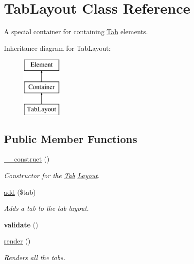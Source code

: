 \hypertarget{class_tab_layout}{
\section{TabLayout Class Reference}
\label{class_tab_layout}
}


A special container for containing \hyperlink{class_tab}{Tab} elements.  


Inheritance diagram for TabLayout:\begin{figure}[H]
\begin{center}
\leavevmode
\includegraphics[height=3.000000cm]{class_tab_layout}
\end{center}
\end{figure}
\subsection*{Public Member Functions}
\begin{DoxyCompactItemize}
\item 
\hypertarget{class_tab_layout_ae75d2d7aff8de22fec3e9061457d56d1}{
\hyperlink{class_tab_layout_ae75d2d7aff8de22fec3e9061457d56d1}{\_\-\_\-construct} ()}
\label{class_tab_layout_ae75d2d7aff8de22fec3e9061457d56d1}

\begin{DoxyCompactList}\small\item\em Constructor for the \hyperlink{class_tab}{Tab} \hyperlink{class_layout}{Layout}. \item\end{DoxyCompactList}\item 
\hyperlink{class_tab_layout_a2d75b325913de22db7e8cf1437789ed2}{add} (\$tab)
\begin{DoxyCompactList}\small\item\em Adds a tab to the tab layout. \item\end{DoxyCompactList}\item 
\hypertarget{class_tab_layout_a9f05ce893d8788c85a2adbc92a1d9b45}{
{\bfseries validate} ()}
\label{class_tab_layout_a9f05ce893d8788c85a2adbc92a1d9b45}

\item 
\hypertarget{class_tab_layout_aefef425ff0427ea3d8194a0d8dfe03c6}{
\hyperlink{class_tab_layout_aefef425ff0427ea3d8194a0d8dfe03c6}{render} ()}
\label{class_tab_layout_aefef425ff0427ea3d8194a0d8dfe03c6}

\begin{DoxyCompactList}\small\item\em Renders all the tabs. \item\end{DoxyCompactList}\end{DoxyCompactItemize}
